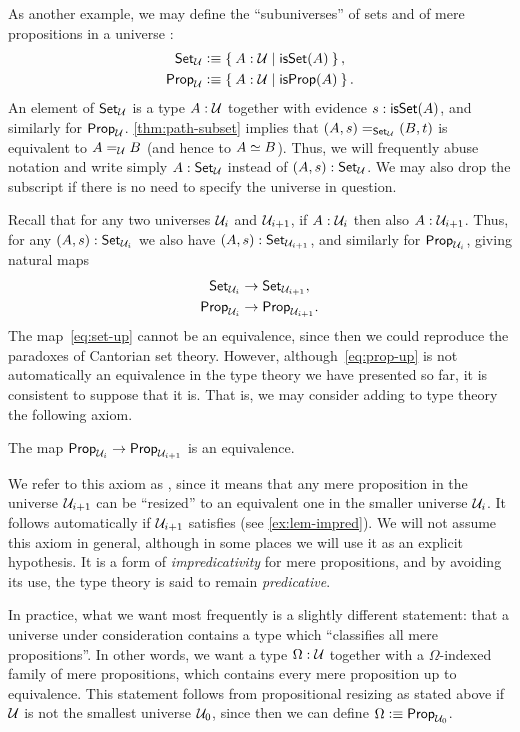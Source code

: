 As another example, we may define the ``subuniverses'' of sets and of mere propositions in a universe \UU:
\begin{align*}
  \setU &\defeq \setof{A:\UU | \isset(A) },\\
  \propU &\defeq \setof{A:\UU | \isprop(A) }.
\end{align*}
An element of $\setU$ is a type $A:\UU$ together with evidence $s:\isset(A)$, and similarly for $\propU$.
\autoref{thm:path-subset} implies that $\id[\setU]{(A,s)}{(B,t)}$ is equivalent to $\id[\UU]AB$ (and hence to $\eqv AB$).
Thus, we will frequently abuse notation and write simply $A:\setU$ instead of $(A,s):\setU$.
We may also drop the subscript \UU if there is no need to specify the universe in question.

Recall that for any two universes $\UU_i$ and $\UU_{i+1}$, if $A:\UU_i$ then also $A:\UU_{i+1}$.
Thus, for any $(A,s):\set_{\UU_i}$ we also have $(A,s):\set_{\UU_{i+1}}$, and similarly for $\prop_{\UU_i}$, giving natural maps
\begin{align}
  \set_{\UU_i} &\to \set_{\UU_{i+1}}\label{eq:set-up},\\
  \prop_{\UU_i} &\to \prop_{\UU_{i+1}}.\label{eq:prop-up}
\end{align}
The map~\eqref{eq:set-up} cannot be an equivalence, since then we could reproduce the paradoxes of Cantorian set theory.
However, although~\eqref{eq:prop-up} is not automatically an equivalence in the type theory we have presented so far, it is consistent to suppose that it is.
That is, we may consider adding to type theory the following axiom.

\begin{axiom}
  The map $\prop_{\UU_i} \to \prop_{\UU_{i+1}}$ is an equivalence.
\end{axiom}

We refer to this axiom as , since it means that any mere proposition in the universe $\UU_{i+1}$ can be ``resized'' to an equivalent one in the smaller universe $\UU_i$.
It follows automatically if $\UU_{i+1}$ satisfies \LEM{} (see \autoref{ex:lem-impred}).
We will not assume this axiom in general, although in some places we will use it as an explicit hypothesis.
It is a form of \emph{impredicativity} for mere propositions, and by avoiding its use, the type theory is said to remain \emph{predicative}.

In practice, what we want most frequently is a slightly different statement: that a universe \UU under consideration contains a type which ``classifies all mere propositions''.
In other words, we want a type $\Omega:\UU$ together with a $\Omega$-indexed family of mere propositions, which contains every mere proposition up to equivalence.
This statement follows from propositional resizing as stated above if $\UU$ is not the smallest universe $\UU_0$, since then we can define $\Omega\defeq \prop_{\UU_0}$.

